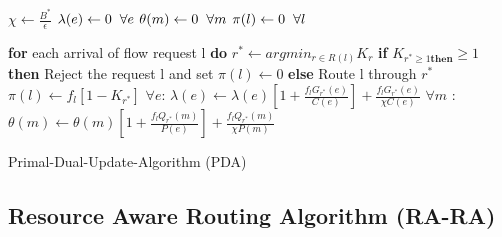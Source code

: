 \begin{algorithm}

$\chi \gets \frac{B^*}{\epsilon}$ \newline
{}\newline
$\lambda(e) \gets 0 \hspace{2mm}\forall e$ \newline
$\theta(m) \gets 0 \hspace{2mm} \forall m$ \newline
$\pi(l) \gets 0 \hspace{2mm} \forall l$ \newline

\textbf{for} each arrival of flow request l \textbf{do} \newline
\hspace{5mm} $r^* \gets argmin_{r \in R(l)}K_r$ \newline
\hspace{10mm} \textbf{if} $K_{r^{*} \ge 1 \textbf{then}
} \ge 1$ \textbf{then} \newline
\hspace{15mm} Reject the request l and set $\pi(l) \gets 0$ \newline
\hspace{5mm} \textbf{else} \newline
\hspace{10mm} Route l through $r^*$ \newline
\hspace{10mm} $\pi(l) \gets f_l[1-K_{r^*}]$ \newline
\hspace{10mm} $\forall e $: \hspace{5mm} $\lambda(e) \gets \lambda(e)[1 + \frac{f_lG_{r^*}(e)}{C(e)}] + \frac{f_lG_{r^*}(e)}{\chi C(e)}$ \newline
\hspace{10mm} $\forall m$ : \hspace{5mm} $\theta(m) \gets \theta(m)[1 + \frac{f_lQ_{r^*}(m)}{P(e)}] + \frac{f_lQ_{r^*}(m)}{\chi P(m)}$
    
 \caption{Primal-Dual-Update-Algorithm (PDA)}
\end{algorithm}

\subsection{Resource Aware Routing Algorithm (RA-RA) \cite{ref:paper2}}
